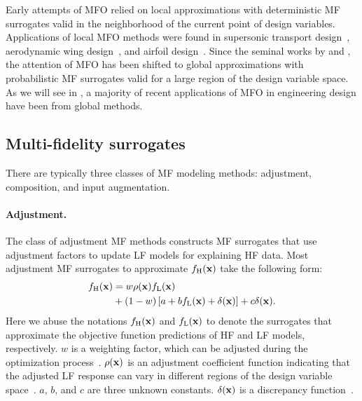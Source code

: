 \documentclass[iicol,sn-basic]{sn-jnl}%
\begin{document}
Early attempts of MFO relied on local approximations with deterministic MF surrogates valid in the neighborhood of the current point of design variables.
Applications of local MFO methods were found in supersonic transport design~\citep{Knill1999}, aerodynamic wing design~\citep{Alexandrov2001}, and airfoil design~\citep{Gano2005}.
Since the seminal works by \cite{Huang2006smo} and \cite{Forrester2007}, the attention of MFO has been shifted to global approximations with probabilistic MF surrogates valid for a large region of the design variable space.
As we will see in , a majority of recent applications of MFO in engineering design have been from global methods.

\subsection{Multi-fidelity surrogates}\label{Sec22}

There are typically three classes of MF modeling methods:
adjustment, composition, and input augmentation.

\paragraph{Adjustment.}
The class of adjustment MF methods constructs MF surrogates that use adjustment factors to update LF models for explaining HF data.
Most adjustment MF surrogates to approximate $f_\text{H}({\bf x})$ take the following form:
\begin{equation}\label{eqn2}
	\begin{aligned}
	 f_\text{H}({\bf x}) & = w \rho({\bf x}) f_\text{L}({\bf x})\\
	&+ (1-w)\left[a + b f_\text{L}({\bf x}) + \delta({\bf x})\right]+ c \delta({\bf x}).
\end{aligned}
\end{equation}
Here we abuse the notations $f_\text{H}({\bf x})$ and $f_\text{L}(\bf x)$ to denote the surrogates that approximate the objective function predictions of HF and LF models, respectively.
$w$ is a weighting factor, which can be adjusted during the optimization process~\citep{Gano2005}.
$\rho({\bf {x}})$ is an adjustment coefficient function indicating that the adjusted LF response can vary in different regions of the design variable space~\citep{Haftka1991}.
$a$, $b$, and $c$ are three unknown constants.
$\delta({\bf{x}})$ is a discrepancy function~\citep{Kennedy2000}.
\end{document}
